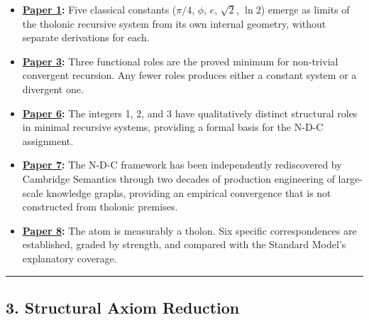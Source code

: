 \documentclass[
  11pt,
  letterpaper,
]{article}
\providecommand{\tightlist}{%
  \setlength{\itemsep}{0pt}\setlength{\parskip}{0pt}}
\begin{document}
\begin{itemize}
\tightlist
\item
  \textbf{\href{https://github.com/baardev/truevalue/blob/main/docnav/Research/papers/1_recursive-tholonic-five-constants/1_recursive-tholonic-five-constants.pdf}{Paper
  1}:} Five classical constants (\(\pi/4\), \(\phi\), \(e\),
  \(\sqrt{2}\), \(\ln 2\)) emerge as limits of the tholonic recursive
  system from its own internal geometry, without separate derivations
  for each.
\item
  \textbf{\href{https://github.com/baardev/truevalue/blob/main/docnav/Research/papers/3_minimal-recursive-triadic-framework/3_minimal-recursive-triadic-framework.pdf}{Paper
  3}:} Three functional roles are the proved minimum for non-trivial
  convergent recursion. Any fewer roles produces either a constant
  system or a divergent one.
\item
  \textbf{\href{https://github.com/baardev/truevalue/blob/main/docnav/Research/papers/6_qualitative-nature-integers-triadic-roles/6_qualitative-nature-integers-triadic-roles.pdf}{Paper
  6}:} The integers 1, 2, and 3 have qualitatively distinct structural
  roles in minimal recursive systems, providing a formal basis for the
  N-D-C assignment.
\item
  \textbf{\href{https://github.com/baardev/truevalue/blob/main/docnav/Research/papers/7_cambridge-semantics-tholonic-framework/7_cambridge-semantics-tholonic-framework.pdf}{Paper
  7}:} The N-D-C framework has been independently rediscovered by
  Cambridge Semantics through two decades of production engineering of
  large-scale knowledge graphs, providing an empirical convergence that
  is not constructed from tholonic premises.
\item
  \textbf{\href{https://github.com/baardev/truevalue/blob/main/docnav/Research/papers/8_atom-as-tholon-measurable-phenomena/8_atom-as-tholon-measurable-phenomena.pdf}{Paper
  8}:} The atom is measurably a tholon. Six specific correspondences are
  established, graded by strength, and compared with the Standard
  Model's explanatory coverage.
\end{itemize}

\begin{center}\rule{0.5\linewidth}{0.5pt}\end{center}

\subsection{3. Structural Axiom
Reduction}\label{structural-axiom-reduction}
\end{document}
